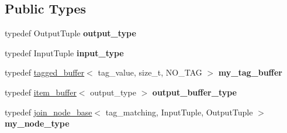 \subsection*{Public Types}
\begin{DoxyCompactItemize}
\item 
\hypertarget{classinternal_1_1join__node__FE_3_01tag__matching_00_01InputTuple_00_01OutputTuple_01_4_ad2668a124befa9fb8772675a06e7a6cd}{}typedef Output\+Tuple {\bfseries output\+\_\+type}\label{classinternal_1_1join__node__FE_3_01tag__matching_00_01InputTuple_00_01OutputTuple_01_4_ad2668a124befa9fb8772675a06e7a6cd}

\item 
\hypertarget{classinternal_1_1join__node__FE_3_01tag__matching_00_01InputTuple_00_01OutputTuple_01_4_ab66dfbeb2ee26a96ed972a3385990183}{}typedef Input\+Tuple {\bfseries input\+\_\+type}\label{classinternal_1_1join__node__FE_3_01tag__matching_00_01InputTuple_00_01OutputTuple_01_4_ab66dfbeb2ee26a96ed972a3385990183}

\item 
\hypertarget{classinternal_1_1join__node__FE_3_01tag__matching_00_01InputTuple_00_01OutputTuple_01_4_a265d85130502547d4f8d98e0b387ee4a}{}typedef \hyperlink{classinternal_1_1tagged__buffer}{tagged\+\_\+buffer}$<$ tag\+\_\+value, size\+\_\+t, N\+O\+\_\+\+T\+A\+G $>$ {\bfseries my\+\_\+tag\+\_\+buffer}\label{classinternal_1_1join__node__FE_3_01tag__matching_00_01InputTuple_00_01OutputTuple_01_4_a265d85130502547d4f8d98e0b387ee4a}

\item 
\hypertarget{classinternal_1_1join__node__FE_3_01tag__matching_00_01InputTuple_00_01OutputTuple_01_4_a25497803ea15e6e9c3ec565ad6c1aaa9}{}typedef \hyperlink{classinternal_1_1item__buffer}{item\+\_\+buffer}$<$ output\+\_\+type $>$ {\bfseries output\+\_\+buffer\+\_\+type}\label{classinternal_1_1join__node__FE_3_01tag__matching_00_01InputTuple_00_01OutputTuple_01_4_a25497803ea15e6e9c3ec565ad6c1aaa9}

\item 
\hypertarget{classinternal_1_1join__node__FE_3_01tag__matching_00_01InputTuple_00_01OutputTuple_01_4_ab017c8533291363d24bcab15108fde33}{}typedef \hyperlink{classinternal_1_1join__node__base}{join\+\_\+node\+\_\+base}$<$ tag\+\_\+matching, Input\+Tuple, Output\+Tuple $>$ {\bfseries my\+\_\+node\+\_\+type}\label{classinternal_1_1join__node__FE_3_01tag__matching_00_01InputTuple_00_01OutputTuple_01_4_ab017c8533291363d24bcab15108fde33}

\end{DoxyCompactItemize}
